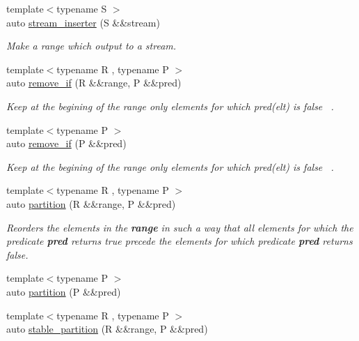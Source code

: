 \begin{DoxyCompactItemize}
{\footnotesize template$<$typename S $>$ }\\auto \mbox{\hyperlink{namespacerah_a3f7b590b1bd8a44b5b2d6f4e35f1837c}{stream\+\_\+inserter}} (S \&\&stream)
\begin{DoxyCompactList}\small\item\em Make a range which output to a stream. \end{DoxyCompactList}\item 
{\footnotesize template$<$typename R , typename P $>$ }\\auto \mbox{\hyperlink{namespacerah_afba9495316f20f6caee735c15feb349c}{remove\+\_\+if}} (R \&\&range, P \&\&pred)
\begin{DoxyCompactList}\small\item\em Keep at the begining of the range only elements for which pred(elt) is false~\newline
. \end{DoxyCompactList}\item 
{\footnotesize template$<$typename P $>$ }\\auto \mbox{\hyperlink{namespacerah_af598cf91c554f6d6938c320578e6bb02}{remove\+\_\+if}} (P \&\&pred)
\begin{DoxyCompactList}\small\item\em Keep at the begining of the range only elements for which pred(elt) is false~\newline
. \end{DoxyCompactList}\item 
{\footnotesize template$<$typename R , typename P $>$ }\\auto \mbox{\hyperlink{namespacerah_a97ae3ed90fe486c2dd3a90fee811bcd7}{partition}} (R \&\&range, P \&\&pred)
\begin{DoxyCompactList}\small\item\em Reorders the elements in the {\bfseries{range}} in such a way that all elements for which the predicate {\bfseries{pred}} returns {\ttfamily true} precede the elements for which predicate {\bfseries{pred}} returns {\ttfamily false}. \end{DoxyCompactList}\item 
{\footnotesize template$<$typename P $>$ }\\auto \mbox{\hyperlink{namespacerah_afeced5adb7a17c0c8f34b64559ddc60c}{partition}} (P \&\&pred)
\item 
{\footnotesize template$<$typename R , typename P $>$ }\\auto \mbox{\hyperlink{namespacerah_ac184b21a98515705f9b4845875fb689b}{stable\+\_\+partition}} (R \&\&range, P \&\&pred)

\end{DoxyCompactItemize}
